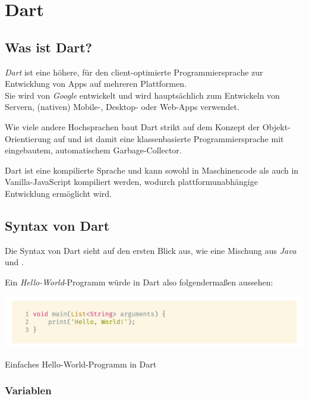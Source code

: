 \section{Dart}

\subsection{Was ist Dart?}

\textit{Dart} ist eine höhere, für den client-optimierte Programmiersprache
zur Entwicklung von Apps auf mehreren Plattformen.\\
Sie wird von \textit{Google} entwickelt und wird hauptsächlich zum Entwickeln von
Servern, (nativen) Mobile-, Desktop- oder Web-Apps verwendet.

Wie viele andere Hochsprachen baut Dart strikt auf dem Konzept der Objekt-Orientierung auf
und ist damit eine klassenbasierte Programmiersprache mit eingebautem, automatischem
Garbage-Collector.

Dart ist eine kompilierte Sprache und kann sowohl in Maschinencode als auch in \\
Vanilla-JavaScript kompiliert werden, wodurch plattformunabhängige Entwicklung ermöglicht 
wird.

\subsection{Syntax von Dart}

Die Syntax von Dart sieht auf den ersten Blick aus, wie eine Mischung aus \textit{Java}\\
und .

Ein \textit{Hello-World}-Programm würde in Dart also folgendermaßen aussehen:

\begin{code}
    \centering
    \includegraphics[width=1\textwidth]{images/Dart/theory/dartHelloWorld.png}
    \caption{Einfaches Hello-World-Programm in Dart}
\end{code}

\subsubsection{Variablen}

